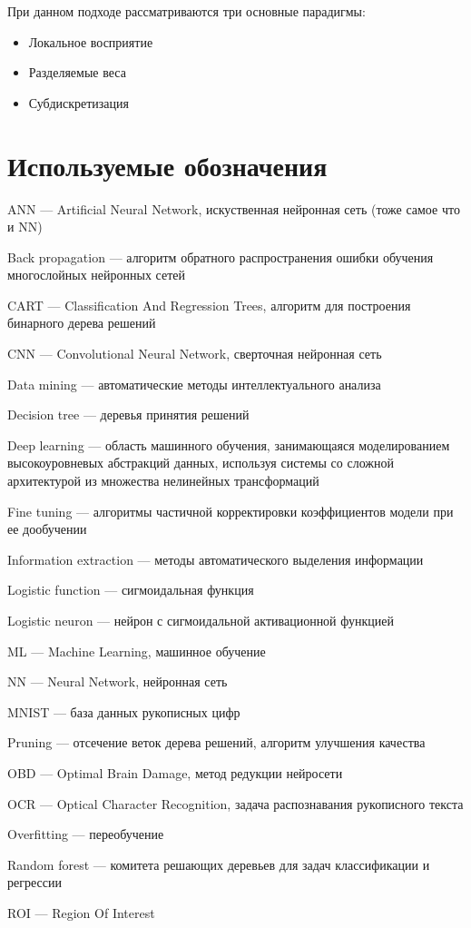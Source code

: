 \documentclass[a4paper,14pt]{extarticle} %
\begin{document}
При данном подходе рассматриваются три основные парадигмы:
\begin{itemize}
\item Локальное восприятие
\item Разделяемые веса
\item Субдискретизация
\end{itemize}

\newpage
\section*{Используемые обозначения}
ANN --- Artificial Neural Network, искуственная нейронная сеть (тоже самое что и NN)

\noindent Back propagation --- алгоритм обратного распространения ошибки обучения многослойных нейронных сетей 

\noindent CART --- Classification And Regression Trees, алгоритм  для построения бинарного дерева решений

\noindent CNN --- Convolutional Neural Network, сверточная нейронная сеть

\noindent Data mining --- автоматические методы интеллектуального анализа

\noindent Decision tree --- деревья принятия решений

\noindent Deep learning --- область машинного обучения, занимающаяся моделированием высокоуровневых абстракций данных, используя системы со сложной архитектурой из множества нелинейных трансформаций

\noindent Fine tuning --- алгоритмы частичной корректировки коэффициентов модели при ее дообучении

\noindent Information extraction --- методы автоматического выделения информации

\noindent Logistic function --- сигмоидальная функция 

\noindent Logistic neuron --- нейрон с сигмоидальной активационной функцией

\noindent ML --- Machine Learning, машинное обучение

\noindent NN --- Neural Network, нейронная сеть

\noindent MNIST --- база данных рукописных цифр

\noindent Pruning --- отсечение веток дерева решений, алгоритм улучшения качества

\noindent OBD --- Optimal Brain Damage, метод редукции нейросети

\noindent OCR --- Optical Character Recognition, задача распознавания рукописного текста

\noindent Overfitting --- переобучение 

\noindent Random forest --- комитета решающих деревьев для задач классификации и регрессии

\noindent ROI --- Region Of Interest 

\newpage
\begin{flushleft}
\end{flushleft}
\end{document}
